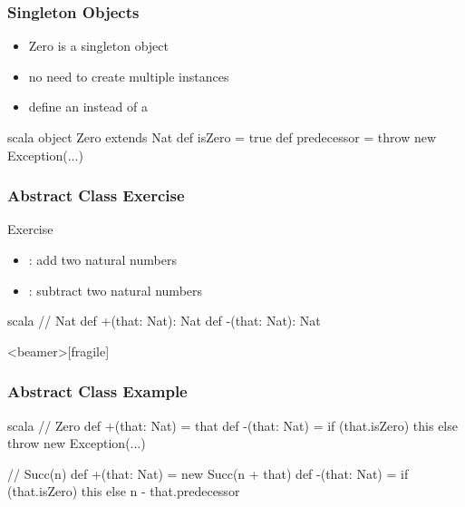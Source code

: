 \documentclass[dvipsnames]{beamer}
\theoremstyle{plain}
\begin{document}
\begin{frame}[fragile]
  \frametitle{Singleton Objects}

  \begin{example}[Scala]
    \begin{itemize}
      \item Zero is a singleton object
      \item no need to create multiple instances
      \item define an  instead of a 
    \end{itemize}

    \pause
    \medskip
    \begin{pygments}{scala}
object Zero extends Nat {
    def isZero = true
    def predecessor = throw new Exception(...)
}
    \end{pygments}
  \end{example}
\end{frame}

\begin{frame}[fragile]
  \frametitle{Abstract Class Exercise}

  \begin{block}{Exercise}
    \begin{itemize}
      \item {}: add two natural numbers
      \item {}: subtract two natural numbers
    \end{itemize}

    \begin{pygments}{scala}
// Nat
def +(that: Nat): Nat
def -(that: Nat): Nat
    \end{pygments}
  \end{block}
\end{frame}

\begin{frame}<beamer>[fragile]
  \frametitle{Abstract Class Example}

  \begin{example}[Scala]
    \begin{pygments}{scala}
// Zero
def +(that: Nat) = that
def -(that: Nat) =
    if (that.isZero) this
    else throw new Exception(...)

// Succ(n)
def +(that: Nat) = new Succ(n + that)
def -(that: Nat) =
    if (that.isZero) this
    else n - that.predecessor
    \end{pygments}
  \end{example}
\end{frame}
\end{document}
